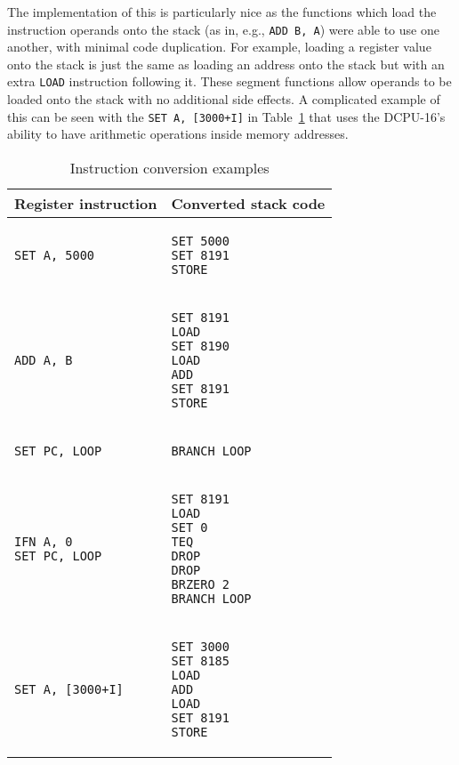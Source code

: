 The implementation of this is particularly nice as the functions which load the
instruction operands onto the stack (as in, e.g., \texttt{ADD B, A}) were able
to use one another, with minimal code duplication. For example, loading a
register value onto the stack is just the same as loading an address onto the
stack but with an extra \texttt{LOAD} instruction following it. These segment
functions allow operands to be loaded onto the stack with no additional side
effects. A complicated example of this can be seen with the \texttt{SET A,
[3000+I]} in Table~\ref{tab:conversionexs} that uses the DCPU-16's ability to
have arithmetic operations inside memory addresses.

\begin{table}
\caption{Instruction conversion examples}
\begin{tabular}{l l}\label{tab:conversionexs}
Register instruction & Converted stack code \\ \toprule
\begin{lstlisting}
SET A, 5000
\end{lstlisting} &
\begin{lstlisting}
SET 5000
SET 8191
STORE
\end{lstlisting} \\ \midrule
\begin{lstlisting}
ADD A, B
\end{lstlisting} &
\begin{lstlisting}
SET 8191
LOAD
SET 8190
LOAD
ADD
SET 8191
STORE
\end{lstlisting} \\ \midrule
\begin{lstlisting}
SET PC, LOOP
\end{lstlisting} &
\begin{lstlisting}
BRANCH LOOP
\end{lstlisting} \\ \midrule
\begin{lstlisting}
IFN A, 0
SET PC, LOOP
\end{lstlisting} &
\begin{lstlisting}
SET 8191
LOAD
SET 0
TEQ
DROP
DROP
BRZERO 2
BRANCH LOOP
\end{lstlisting} \\ \midrule
\begin{lstlisting}
SET A, [3000+I]
\end{lstlisting} &
\begin{lstlisting}
SET 3000
SET 8185
LOAD
ADD
LOAD
SET 8191
STORE
\end{lstlisting} \\ \bottomrule
\end{tabular}
\end{table}

